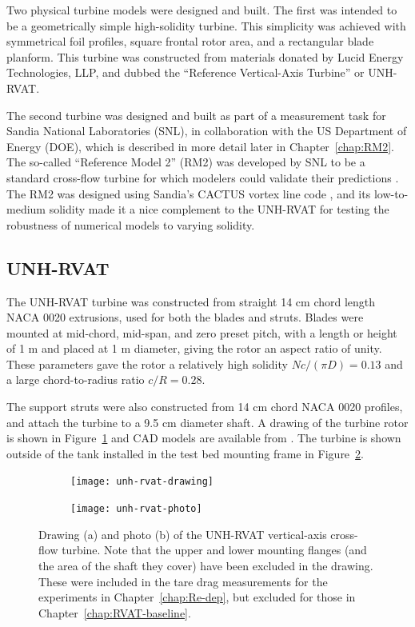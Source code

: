 Two physical turbine models were designed and built. The first was intended to
be a geometrically simple high-solidity turbine. This simplicity was achieved
with symmetrical foil profiles, square frontal rotor area, and a rectangular
blade planform. This turbine was constructed from materials donated by Lucid
Energy Technologies, LLP, and dubbed the ``Reference Vertical-Axis Turbine'' or
UNH-RVAT.

The second turbine was designed and built as part of a measurement task for
Sandia National Laboratories (SNL), in collaboration with the US Department of
Energy (DOE), which is described in more detail later in Chapter~\ref{chap:RM2}.
The so-called ``Reference Model 2'' (RM2) was developed by SNL to be a standard
cross-flow turbine for which modelers could validate their predictions
\cite{Neary2014}. The RM2 was designed using Sandia's CACTUS vortex line code
\cite{Barone2011}, and its low-to-medium solidity made it a nice complement to
the UNH-RVAT for testing the robustness of numerical models to varying solidity.


\subsection{UNH-RVAT}

The UNH-RVAT turbine was constructed from straight 14 cm chord length NACA 0020
extrusions, used for both the blades and struts. Blades were mounted at
mid-chord, mid-span, and zero preset pitch, with a length or height of 1 m and
placed at 1 m diameter, giving the rotor an aspect ratio of unity. These
parameters gave the rotor a relatively high solidity $Nc/(\pi D) = 0.13$ and a
large chord-to-radius ratio $c/R = 0.28$.

The support struts were also constructed from 14 cm chord NACA 0020 profiles,
and attach the turbine to a 9.5 cm diameter shaft. A drawing of the turbine
rotor is shown in Figure~\ref{fig:rvat-drawing} and CAD models are available
from \cite{Bachant2014-RVAT-CAD}. The turbine is shown outside of the tank
installed in the test bed mounting frame in Figure~\ref{fig:rvat-photo}.

\begin{figure}
    \centering
    \begin{subfigure}{0.49\textwidth}
        \texttt{[image: unh-rvat-drawing]}
        \caption{}
        \label{fig:rvat-drawing}
    \end{subfigure}
    \begin{subfigure}{0.47\textwidth}
        \texttt{[image: unh-rvat-photo]}
        \caption{}
        \label{fig:rvat-photo}
    \end{subfigure}

    \caption{Drawing (a) and photo (b) of the UNH-RVAT vertical-axis cross-flow
        turbine. Note that the upper and lower mounting flanges (and the area of the
        shaft they cover) have been excluded in the drawing. These were included in
        the tare drag measurements for the experiments in Chapter~\ref{chap:Re-dep},
        but excluded for those in Chapter~\ref{chap:RVAT-baseline}.}

    \label{fig:unh-rvat}
\end{figure}


